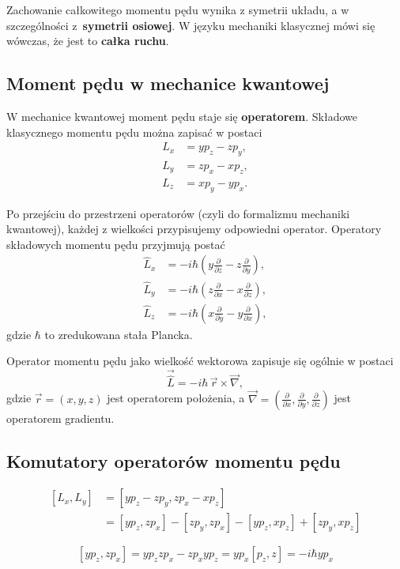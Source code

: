 Zachowanie całkowitego momentu pędu wynika z symetrii układu, a w szczególności z~\textbf{symetrii osiowej}. W języku mechaniki klasycznej mówi się wówczas, że jest to \textbf{całka ruchu}.

\subsection{Moment pędu w mechanice kwantowej}
W mechanice kwantowej moment pędu staje się \textbf{operatorem}. Składowe klasycznego momentu pędu można zapisać w postaci
$$
\begin{aligned}
L_x &= y p_z - z p_y, \\
L_y &= z p_x - x p_z, \\
L_z &= x p_y - y p_x.
\end{aligned}
$$

Po przejściu do przestrzeni operatorów (czyli do formalizmu mechaniki kwantowej), każdej z wielkości przypisujemy odpowiedni operator. Operatory składowych momentu pędu przyjmują postać
$$
\begin{aligned}
\hat{L}_x &= -i\hbar \left( y \frac{\partial}{\partial z} - z \frac{\partial}{\partial y} \right), \\
\hat{L}_y &= -i\hbar \left( z \frac{\partial}{\partial x} - x \frac{\partial}{\partial z} \right), \\
\hat{L}_z &= -i\hbar \left( x \frac{\partial}{\partial y} - y \frac{\partial}{\partial x} \right),
\end{aligned}
$$
gdzie $\hbar$ to zredukowana stała Plancka.

Operator momentu pędu jako wielkość wektorowa zapisuje się ogólnie w postaci
$$
\vec{\hat{L}} = -i\hbar\, \vec{r} \times \vec{\nabla},
$$
gdzie $\vec{r} = (x, y, z)$ jest operatorem położenia, a $\vec{\nabla} = \left( \frac{\partial}{\partial x}, \frac{\partial}{\partial y}, \frac{\partial}{\partial z} \right)$ jest operatorem gradientu.

\subsection{Komutatory operatorów momentu pędu}
$$
\begin{aligned}
[L_x, L_y] &= [y p_z - z p_y, z p_x - x p_z] \\
&= [y p_z, z p_x] - [z p_y, z p_x] - [y p_z, x p_z] + [z p_y, x p_z]
\end{aligned}
$$

$$
[yp_z, zp_x] = yp_z zp_x - zp_x yp_z = y p_x [p_z, z] = -i\hbar y p_x
$$

